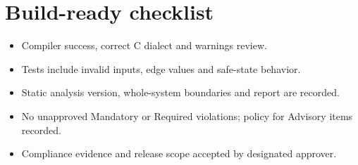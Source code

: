 \documentclass[10pt,letterpaper]{article}
\begin{document}
\section{Build-ready checklist}
\begin{itemize}
\item[$\square$] Compiler success, correct C dialect and warnings review.
\item[$\square$] Tests include invalid inputs, edge values and safe-state behavior.
\item[$\square$] Static analysis version, whole-system boundaries and report are recorded.
\item[$\square$] No unapproved Mandatory or Required violations; policy for Advisory items recorded.
\item[$\square$] Compliance evidence and release scope accepted by designated approver.
\end{itemize}
\end{document}
